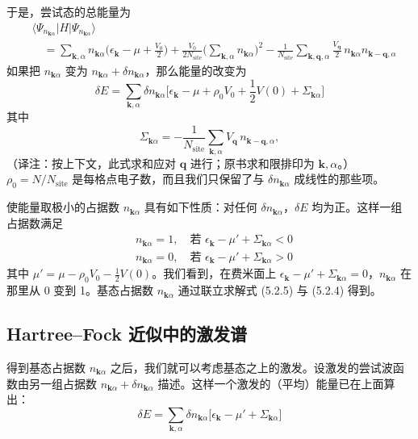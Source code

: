 于是，尝试态的总能量为
\begin{align*}
&\langle \Psi_{n_{\pmb{k}\alpha}} | H | \Psi_{n_{\pmb{k}\alpha}} \rangle \tag{5.2.2}\\
&\quad = \sum_{\pmb{k},\alpha} n_{\pmb{k}\alpha} \Big( \epsilon_{\pmb{k}} - \mu + \frac{V_0}{2} \Big) + \frac{V_0}{2N_{\mathrm{site}}} \Big( \sum_{\pmb{k},\alpha} n_{\pmb{k}\alpha} \Big)^{2} - \frac{1}{N_{\mathrm{site}}} \sum_{\pmb{k},\pmb{q},\alpha} \frac{V_{\pmb{q}}}{2}\, n_{\pmb{k}\alpha} n_{\pmb{k}-\pmb{q},\alpha}
\end{align*}
如果把 $n_{\pmb{k}\alpha}$ 变为 $n_{\pmb{k}\alpha}+\delta n_{\pmb{k}\alpha}$，那么能量的改变为
\begin{equation*}
\delta E = \sum_{\pmb{k},\alpha} \delta n_{\pmb{k}\alpha} \Big[ \epsilon_{\pmb{k}} - \mu + \rho_0 V_0 + \frac{1}{2} V(0) + \Sigma_{\pmb{k}\alpha} \Big] \tag{5.2.3}
\end{equation*}
其中
\begin{equation*}
\Sigma_{\pmb{k}\alpha} = -\frac{1}{N_{\mathrm{site}}} \sum_{\pmb{k},\alpha} V_{\pmb{q}}\, n_{\pmb{k}-\pmb{q},\alpha}, \tag{5.2.4}
\end{equation*}
（译注：按上下文，此式求和应对 $\pmb{q}$ 进行；原书求和限排印为 $\pmb{k},\alpha$。）
$\rho_0 = N/N_{\mathrm{site}}$ 是每格点电子数，而且我们只保留了与 $\delta n_{\pmb{k}\alpha}$ 成线性的那些项。

使能量取极小的占据数 $n_{\pmb{k}\alpha}$ 具有如下性质：对任何 $\delta n_{\pmb{k}\alpha}$，$\delta E$ 均为正。这样一组占据数满足
\begin{align*}
&n_{\pmb{k}\alpha} = 1, \quad \text{若 } \epsilon_{\pmb{k}} - \mu' + \Sigma_{\pmb{k}\alpha} < 0\\
&n_{\pmb{k}\alpha} = 0, \quad \text{若 } \epsilon_{\pmb{k}} - \mu' + \Sigma_{\pmb{k}\alpha} > 0 \tag{5.2.5}
\end{align*}
其中 $\mu' = \mu - \rho_0 V_0 - \frac{1}{2}V(0)$。我们看到，在费米面上 $\epsilon_{\pmb{k}} - \mu' + \Sigma_{\pmb{k}\alpha} = 0$，$n_{\pmb{k}\alpha}$ 在那里从 0 变到 1。基态占据数 $n_{\pmb{k}\alpha}$ 通过联立求解式 (5.2.5) 与 (5.2.4) 得到。

\subsection{Hartree--Fock 近似中的激发谱}

得到基态占据数 $n_{\pmb{k}\alpha}$ 之后，我们就可以考虑基态之上的激发。设激发的尝试波函数由另一组占据数 $n_{\pmb{k}\alpha}+\delta n_{\pmb{k}\alpha}$ 描述。这样一个激发的（平均）能量已在上面算出：
\begin{equation*}
\delta E = \sum_{\pmb{k},\alpha} \delta n_{\pmb{k}\alpha} \big[ \epsilon_{\pmb{k}} - \mu' + \Sigma_{\pmb{k}\alpha} \big] \tag{5.2.6}
\end{equation*}

